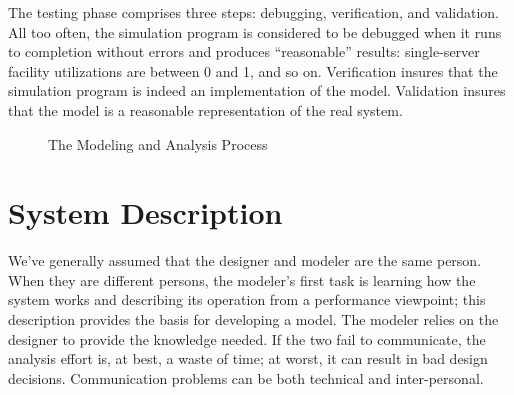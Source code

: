 The testing phase comprises three steps: debugging, verification, and
validation. All too often, the simulation program is considered to be
debugged when it runs to completion without errors and produces
``reasonable'' results: single-server facility utilizations are between 0 and 1,
and so on. Verification insures that the simulation program is indeed an
implementation of the model. Validation insures that the model is a
reasonable representation of the real system.

\begin{figure}[ht]
\centering
{}
\caption{The Modeling and Analysis Process}
\end{figure}

\section{System Description}
\label{sec:system-description}

We've generally assumed that the designer and modeler are the same person.
When they are different persons, the modeler's first task is learning how the
system works and describing its operation from a performance viewpoint; this
description provides the basis for developing a model. The modeler relies on
the designer to provide the knowledge needed. If the two fail to communicate,
the analysis effort is, at best, a waste of time; at worst, it can result in bad
design decisions. Communication problems can be both technical and
inter-personal.

